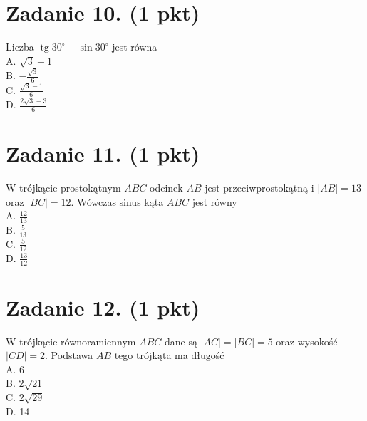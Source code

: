 \documentclass[10pt]{article}
\begin{document}
\section*{Zadanie 10. (1 pkt)}
Liczba \(\operatorname{tg} 30^{\circ}-\sin 30^{\circ}\) jest równa\\
A. \(\sqrt{3}-1\)\\
B. \(-\frac{\sqrt{3}}{6}\)\\
C. \(\frac{\sqrt{3}-1}{6}\)\\
D. \(\frac{2 \sqrt{3}-3}{6}\)

\section*{Zadanie 11. (1 pkt)}
W trójkącie prostokątnym \(A B C\) odcinek \(A B\) jest przeciwprostokątną i \(|A B|=13\) oraz \(|B C|=12\). Wówczas sinus kąta \(A B C\) jest równy\\
A. \(\frac{12}{13}\)\\
B. \(\frac{5}{13}\)\\
C. \(\frac{5}{12}\)\\
D. \(\frac{13}{12}\)

\section*{Zadanie 12. (1 pkt)}
W trójkącie równoramiennym \(A B C\) dane są \(|A C|=|B C|=5\) oraz wysokość \(|C D|=2\). Podstawa \(A B\) tego trójkąta ma długość\\
A. 6\\
B. \(2 \sqrt{21}\)\\
C. \(2 \sqrt{29}\)\\
D. 14
\end{document}
